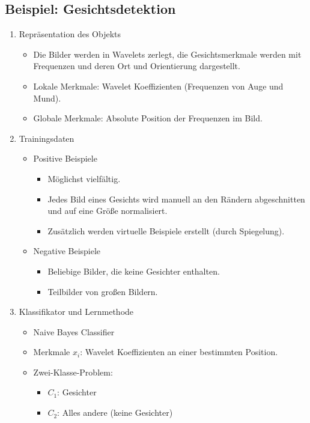 		\subsection{Beispiel: Gesichtsdetektion}
			\begin{enumerate}
				\item Repräsentation des Objekts
					\begin{itemize}
						\item Die Bilder werden in Wavelets zerlegt, \dh die Gesichtsmerkmale werden mit Frequenzen und deren Ort und Orientierung dargestellt.
						\item Lokale Merkmale: Wavelet Koeffizienten (Frequenzen von \zB Auge und Mund).
						\item Globale Merkmale: Absolute Position der Frequenzen im Bild.
					\end{itemize}
				\item Trainingsdaten
					\begin{itemize}
						\item Positive Beispiele
							\begin{itemize}
								\item Möglichst vielfältig.
								\item Jedes Bild eines Gesichts wird manuell an den Rändern abgeschnitten und auf eine Größe normalisiert.
								\item Zusätzlich werden virtuelle Beispiele erstellt (\zB durch Spiegelung).
							\end{itemize}
						\item Negative Beispiele
							\begin{itemize}
								\item Beliebige Bilder, die keine Gesichter enthalten.
								\item Teilbilder von großen Bildern.
							\end{itemize}
					\end{itemize}
				\item Klassifikator und Lernmethode
					\begin{itemize}
						\item Naive Bayes Classifier
						\item Merkmale \(x_i\): Wavelet Koeffizienten an einer bestimmten Position.
						\item Zwei-Klasse-Problem:
							\begin{itemize}
								\item \(C_1\): Gesichter
								\item \(C_2\): Alles andere (keine Gesichter)

\end{itemize}
\end{itemize}
\end{enumerate}
